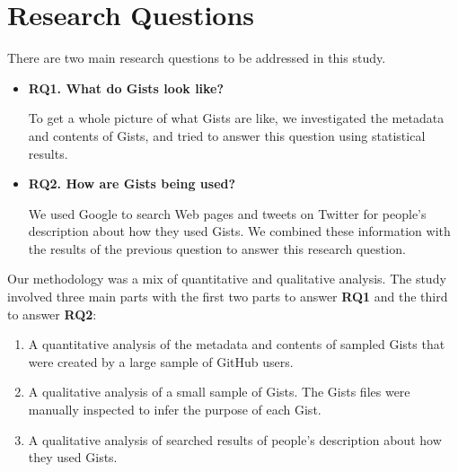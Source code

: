 \section{Research Questions}

There are two main research questions to be addressed in this study.  
\begin{itemize}

  \item {\bf RQ1. What do Gists look like?}
   
  To get a whole picture of what Gists are like, we investigated the metadata and contents of Gists, and tried to answer this question using statistical results.


  \item {\bf RQ2. How are Gists being used?}

  We used Google to search Web pages and tweets on Twitter for people's description about how they used Gists. We combined these information with the results of the previous question to answer this research question.

\end{itemize}

Our methodology was a mix of quantitative and qualitative analysis. The study involved three main parts with the first two parts to answer {\bf RQ1} and the third to answer {\bf RQ2}:

\begin{enumerate}

  \item A quantitative analysis of the metadata and contents of sampled Gists that were created by a large sample of GitHub users.

  \item A qualitative analysis of a small sample of Gists. The Gists files were manually inspected to infer the purpose of each Gist.

  \item A qualitative analysis of searched results of people's description about how they used Gists. 
\end{enumerate}
